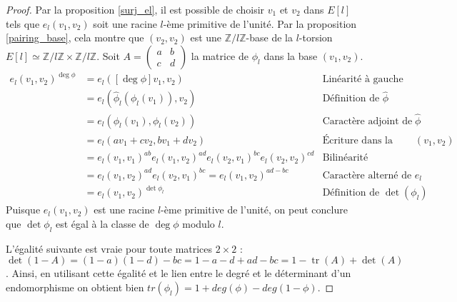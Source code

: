 \documentclass{article}
\theoremstyle{plain}%
\newtheorem{prop}[thm]{Proposition}
\theoremstyle{definition}%
\newcommand{\F}{\mathbb{F}}
\newcommand{\Z}{\mathbb{Z}}
\newcommand{\h}{\widehat}
\DeclareMathOperator{\tr}{tr}
\begin{document}
\begin{proof}
  Par la proposition \ref{surj_el}, il est possible de choisir $v_1$ et $v_2$ dans $E[l]$ tels que $e_l(v_1, v_2)$ soit une racine $l$-ème primitive de l'unité. Par la proposition \ref{pairing_base}, cela montre que $(v_2, v_2)$ est une $\Z/l\Z$-base de la $l$-torsion $E[l] \simeq \Z/l\Z\times\Z/l\Z$. 
  Soit $A = \begin{pmatrix} a & b \\ c & d \end{pmatrix}$ la matrice de $\phi_l$ dans la base $(v_1, v_2)$.
  \begin{align*}
  e_l(v_1, v_2)^{\deg\phi} 
  &= e_l([\deg\phi]v_1, v_2) & \text{Linéarité à gauche} \\
  &= e_l(\h\phi_l(\phi_l(v_1)), v_2) & \text{Définition de $\h\phi$} \\
  &= e_l(\phi_l(v_1), \phi_l(v_2)) & \text{Caractère adjoint de $\h\phi$} \\
  &= e_l(av_1+cv_2, bv_1+dv_2) & \text{Écriture dans la base $(v_1, v_2)$} \\
  &= e_l(v_1, v_1)^{ab} e_l(v_1, v_2)^{ad} e_l(v_2, v_1)^{bc} e_l(v_2, v_2)^{cd} & \text{Bilinéarité} \\
  &= e_l(v_1, v_2)^{ad} e_l(v_2, v_1)^{bc} = e_l(v_1, v_2)^{ad-bc} & \text{Caractère alterné de $e_l$} \\
  &= e_l(v_1, v_2)^{\det\phi_l} & \text{Définition de $\det(\phi_l)$}
  \end{align*}
  Puisque $e_l(v_1, v_2)$ est une racine $l$-ème primitive de l'unité, on peut conclure que $\det\phi_l$ est égal à la classe de $\deg\phi$ modulo $l$.

   L'égalité suivante est vraie pour toute matrices $2\times 2$ : $\det(1-A) = (1-a)(1-d) - bc = 1 -a -d + ad -bc = 1 - \tr(A) + \det(A)$. Ainsi, en utilisant cette égalité et le lien entre le degré et le déterminant d'un endomorphisme on obtient bien $tr(\phi_l) = 1 + deg(\phi) - deg(1-\phi)$.   
\end{proof}

%
\end{document}
